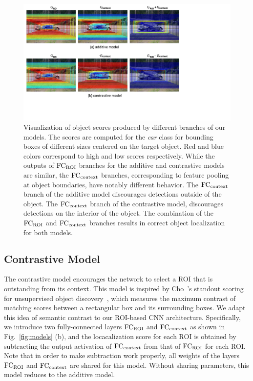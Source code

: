 \begin{figure}[t]
\centering
\includegraphics[width=\textwidth, trim={0mm 3.5cm 8cm 0cm},clip]{images/modelvis.pdf}
\caption[small]{
Visualization of object scores produced by different branches of our models. The scores are computed
for the {\em car} class for bounding boxes of different sizes centered on the target object. Red and blue
colors correspond to high and low scores respectively. While the outputs of ${\rm FC_{ROI}}$ branches for the
additive and contrastive models are similar, the ${\rm FC_{context}}$ branches, corresponding to feature
pooling at object boundaries, have notably different behavior. The ${\rm FC_{context}}$ branch of the additive model
discourages detections outside of the object. The ${\rm FC_{context}}$ branch of the contrastive model, discourages
detections on the interior of the object. The combination of the ${\rm FC_{ROI}}$ and ${\rm FC_{context}}$ branches results in correct object
localization for both models.
}
\label{fig:modelvis}
\end{figure}

\subsection{Contrastive Model} \label{sec:contrastive}



The contrastive model encourages the network to select a ROI that is
outstanding from its context.  This model is inspired by Cho~\etal's
standout scoring for unsupervised object discovery~\cite{Cho:2015vz}, which
measures the maximum contrast of matching scores between a rectangular box and
its surrounding boxes. We adapt this idea of semantic contrast to our ROI-based
CNN architecture. Specifically, we introduce two fully-connected layers ${\rm FC_{ROI}}$ and ${\rm FC_{context}}$ as shown in Fig.~\ref{fig:models} (b), and the locacalization score for each ROI is obtained by subtracting the output activation of ${\rm FC_{context}}$ from that of ${\rm FC_{ROI}}$ for each ROI.
Note that in order to make subtraction work properly, all weights of the layers ${\rm
FC_{ROI}}$ and ${\rm FC_{context}}$ are shared for this model. Without sharing parameters, this model reduces to the additive model.  %

